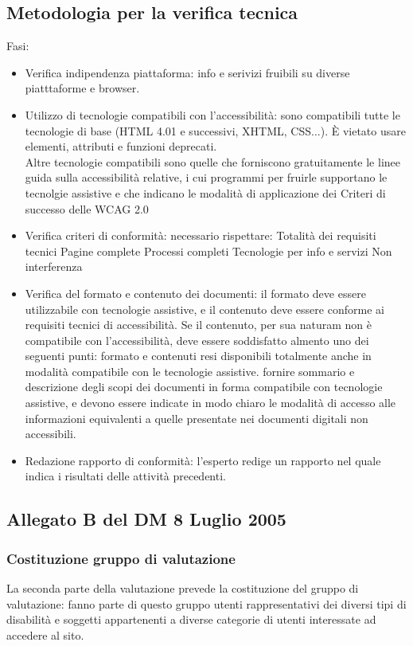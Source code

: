 \documentclass{article}
\begin{document}
\subsection{Metodologia per la verifica tecnica}
Fasi:
\begin{itemize}
	\item Verifica indipendenza piattaforma: info e serivizi fruibili su diverse piatttaforme e browser.
	\item Utilizzo di tecnologie compatibili con l'accessibilità: sono compatibili tutte le tecnologie di base (HTML 4.01 e successivi, XHTML, CSS...). È vietato usare elementi, attributi e funzioni deprecati.\\
	Altre tecnologie compatibili sono quelle che forniscono gratuitamente le linee guida sulla accessibilità relative, i cui programmi per fruirle supportano le tecnolgie assistive e che indicano le modalità di applicazione dei Criteri di successo delle WCAG 2.0
	\item Verifica criteri di conformità: necessario rispettare:
	\subitem Totalità dei requisiti tecnici
	\subitem Pagine complete
	\subitem Processi completi
	\subitem Tecnologie per info e servizi
	\subitem Non interferenza
	\item Verifica del formato e contenuto dei documenti: il formato deve essere utilizzabile con tecnologie assistive, e il contenuto deve essere conforme ai requisiti tecnici di accessibilità. Se il contenuto, per sua naturam non è compatibile con l'accessibilità, deve essere soddisfatto almento uno dei seguenti punti:
	\subitem formato e contenuti resi disponibili totalmente anche in modalità compatibile con le tecnologie assistive.
	\subitem fornire sommario e descrizione degli scopi dei documenti in forma compatibile con tecnologie assistive, e devono essere indicate in modo chiaro le modalità di accesso alle informazioni equivalenti a quelle presentate nei documenti digitali non accessibili.
	\item Redazione rapporto di conformità: l'esperto redige un rapporto nel quale indica i risultati delle attività precedenti.
\end{itemize}
\subsection{Allegato B del DM 8 Luglio 2005}
\subsubsection{Costituzione gruppo di valutazione}
La seconda parte della valutazione prevede la costituzione del gruppo di valutazione: fanno parte di questo gruppo utenti rappresentativi dei diversi tipi di disabilità e soggetti appartenenti a diverse categorie di utenti interessate ad accedere al sito.
\end{document}
